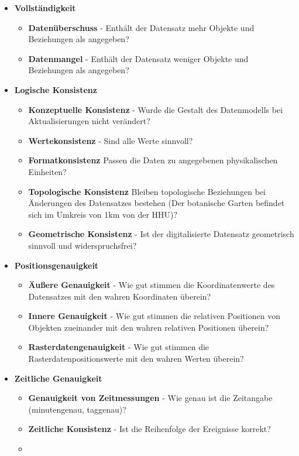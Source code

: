 \documentclass[11pt,fleqn]{book} %
\begin{document}
\begin{itemize}
\item \textbf{Vollständigkeit}
\begin{itemize}
\item \textbf{Datenüberschuss} -
Enthält der Datensatz mehr Objekte und Beziehungen als angegeben?
\item \textbf{Datenmangel} - Enthält der Datensatz weniger Objekte und Beziehungen als angegeben?
\end{itemize}
\item \textbf{Logische Konsistenz}
\begin{itemize}
\item \textbf{Konzeptuelle Konsistenz} - 
Wurde die Gestalt des Datenmodells bei Aktualisierungen nicht verändert?
\item \textbf{Wertekonsistenz} - Sind alle Werte sinnvoll?
\item \textbf{Formatkonsistenz} Passen die Daten zu angegebenen physikalischen Einheiten?
\item \textbf{Topologische Konsistenz} 
Bleiben topologische Beziehungen bei Änderungen des Datensatzes bestehen (Der botanische Garten befindet sich im Umkreis von 1km von der HHU)?
\item \textbf{Geometrische Konsistenz} - Ist der digitalisierte Datensatz geometrisch sinnvoll und widerspruchsfrei?
\end{itemize}
\item \textbf{Positionsgenauigkeit}
\begin{itemize}
\item
\textbf{Äußere Genauigkeit} - Wie gut stimmen die Koordinatenwerte des Datensatzes mit den wahren Koordinaten überein?
\item \textbf{Innere Genauigkeit} - Wie gut stimmen die relativen Positionen von Objekten zueinander mit den wahren relativen Positionen überein?
\item \textbf{Rasterdatengenauigkeit} - Wie gut stimmen die Rasterdatenpositionswerte mit den wahren Werten überein?
\end{itemize}
\item \textbf{Zeitliche Genauigkeit}
\begin{itemize}
\item
\textbf{Genauigkeit von Zeitmessungen} - 
Wie genau ist die Zeitangabe (minutengenau, taggenau)?
\item \textbf{Zeitliche Konsistenz} - Ist die Reihenfolge der Ereignisse korrekt?
\item

\end{itemize}
\end{itemize}
\end{document}
